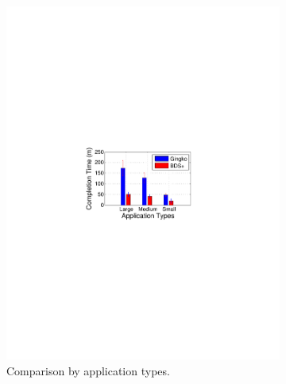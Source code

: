 \begin{figure}[t]
\begin{subfigure}[b]{0.3\textwidth}
                \includegraphics[width=\textwidth]{images/BDS_VS_ANON_journal.pdf}%
                \caption{Comparison by application types.}
                \label{fig:BDSvsAnon:FCT}
        \end{subfigure}
        \begin{subfigure}[b]{0.3\textwidth}
                \centering

\end{subfigure}
\end{figure}
